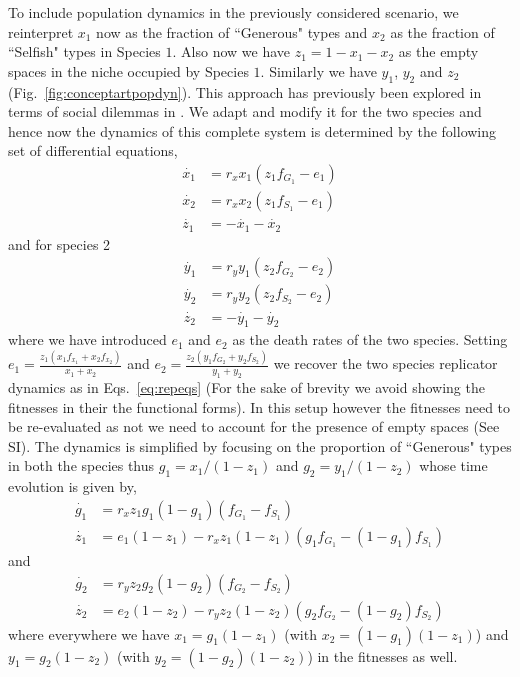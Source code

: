 \documentclass{pnastwo}
\begin{document}
\begin{article}
To include population dynamics in the previously considered scenario, we reinterpret $x_1$ now as the fraction of ``Generous" types and $x_2
$ as the fraction of ``Selfish" types in Species $1$.
Also now we have $z_1 = 1 - x_1 - x_2$ as the empty spaces in the niche occupied by Species $1$. Similarly we have $y_1$, $y_2$ and $z_2$ (Fig.~\ref{fig:conceptartpopdyn}).
This approach has previously been explored in terms of social dilemmas in \cite{hauert:PRSB:2006}.
We adapt and modify it for the two species and hence now the dynamics of this complete system is determined by the following set of differential equations,
%
\begin{align}
	\dot{x_1} &= r_x x_1 (z_1 f_{G_1} - e_1) \nonumber \\
	\dot{x_2} &= r_x x_2 (z_1 f_{S_1} - e_1) \\
	\dot{z_1} &= - \dot{x_1} - \dot{x_2} \nonumber
\end{align}
%
and for species 2
\begin{align}
	\dot{y_1} &= r_y y_1 (z_2 f_{G_2} - e_2) \nonumber \\
	\dot{y_2} &= r_y y_2 (z_2 f_{S_2} - e_2) \\
	\dot{z_2} &= - \dot{y_1} - \dot{y_2} \nonumber
\end{align}
%
where we have introduced $e_1$ and $e_2$ as the death rates of the two species.
Setting $e_1 = \frac{z_1 (x_1 f_{x_1} + x_2 f_{x_2}) }{x_1 + x_2}$ and $e_2 = \frac{z_2 (y_1 f_{G_2} + y_2 f_{S_2}) }{y_1 + y_2}$ we recover the two species replicator dynamics as in Eqs.~\ref{eq:repeqs} (For the sake of brevity we avoid showing the fitnesses in their the functional forms).
In this setup however the fitnesses need to be re-evaluated as not we need to account for the presence of empty spaces (See SI).
The dynamics is simplified by focusing on the proportion of ``Generous" types in both the species thus $g_1 = x_1/(1-z_1)$ and $g_2 = y_1/(1-z_2)$ whose time evolution is given by,
\begin{align}
	\dot{g_1} &= r_x z_1 g_1 (1-g_1) (f_{G_1} - f_{S_1}) \nonumber \\
	\dot{z_1} &= e_1 (1-z_1) - r_x z_1 (1-z_1) (g_1 f_{G_1} -  (1-g_1) f_{S_1})
\end{align}
and
\begin{align}
	\dot{g_2} &= r_y z_2 g_2 (1-g_2) (f_{G_2} - f_{S_2}) \nonumber \\
	\dot{z_2} &= e_2 (1-z_2) - r_y z_2 (1-z_2) (g_2 f_{G_2} -  (1-g_2) f_{S_2})
\end{align}
%
where everywhere we have $x_1 = g_1 (1-z_1)$ (with $x_2 = (1-g_1) (1-z_1)$) and $y_1 = g_2 (1-z_2)$ (with $y_2 = (1-g_2) (1-z_2)$) in the fitnesses as well.


\end{article}
\end{document}
